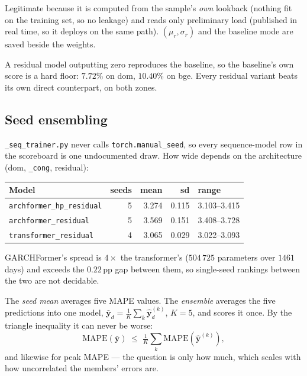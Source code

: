 \documentclass[11pt]{article}
\newcommand{\code}[1]{\texttt{\small #1}}
\begin{document}
\noindent
Legitimate because it is computed from the sample's \emph{own} lookback (nothing fit
on the training set, so no leakage) and reads only preliminary load (published in
real time, so it deploys on the same path). $(\mu_r,\sigma_r)$ and the baseline mode
are saved beside the weights.

\noindent
A residual model outputting zero reproduces the baseline, so the baseline's own
score is a hard floor: $7.72\%$ on dom, $10.40\%$ on bge. Every residual variant
beats its own direct counterpart, on both zones.

\subsection{Seed ensembling}\label{sec:seedens}

\code{\_seq\_trainer.py} never calls \code{torch.manual\_seed}, so every
sequence-model row in the scoreboard is one undocumented draw. How wide depends on
the architecture (dom, \code{\_cong}, residual):

\begin{center}\small
\begin{tabular}{@{}lrrrl@{}}
\toprule
Model & seeds & mean & sd & range \\
\midrule
\code{archformer\_hp\_residual}  & 5 & 3.274 & 0.115 & 3.103--3.415 \\
\code{archformer\_residual}      & 5 & 3.569 & 0.151 & 3.408--3.728 \\
\code{transformer\_residual}     & 4 & 3.065 & 0.029 & 3.022--3.093 \\
\bottomrule
\end{tabular}
\end{center}

\noindent
GARCHFormer's spread is $4\times$ the transformer's ($504\,725$ parameters over
$1461$ days) and exceeds the $0.22$\,pp gap between them, so single-seed rankings
between the two are not decidable.

\noindent
The \emph{seed mean} averages five MAPE values. The \emph{ensemble} averages the
five predictions into one model, $\bar{\mathbf{y}}_d = \frac1K\sum_k \hat{\mathbf{y}}^{(k)}_d$,
$K = 5$, and scores it once. By the triangle inequality it can never be worse:
\begin{equation}
  \mathrm{MAPE}(\bar{\mathbf{y}}) \;\le\; \tfrac1K\textstyle\sum_k \mathrm{MAPE}(\hat{\mathbf{y}}^{(k)}),
\end{equation}
and likewise for peak MAPE --- the question is only how much, which scales with how
uncorrelated the members' errors are.
\end{document}
